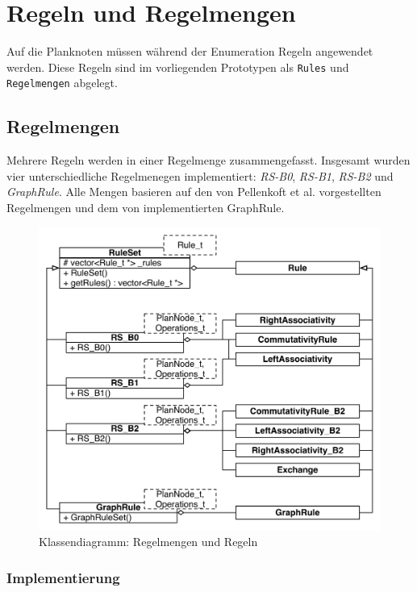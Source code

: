 \section{Regeln und Regelmengen}
Auf die Planknoten müssen während der Enumeration Regeln angewendet werden. Diese Regeln sind im vorliegenden Prototypen als \texttt{Rules} und \texttt{Regelmengen} abgelegt.

\subsection{Regelmengen}
Mehrere Regeln werden in einer Regelmenge zusammengefasst.
Insgesamt wurden vier unterschiedliche Regelmenegen implementiert: \textit{RS-B0}, \textit{RS-B1}, \textit{RS-B2} und \textit{GraphRule}.
Alle Mengen basieren auf den von Pellenkoft et al. vorgestellten Regelmengen und dem von \cite{shanbhag2014optimizing} implementierten GraphRule.

\begin{figure}[ht]
  \centering
  \includegraphics[scale=0.75]{04_Implementierung/00_media/RuleSets.pdf}
  \caption{Klassendiagramm: Regelmengen und Regeln}
  \label{RuleSetClass}
\end{figure}

\subsubsection{Implementierung}
\label{sec:RuleImplementation}


